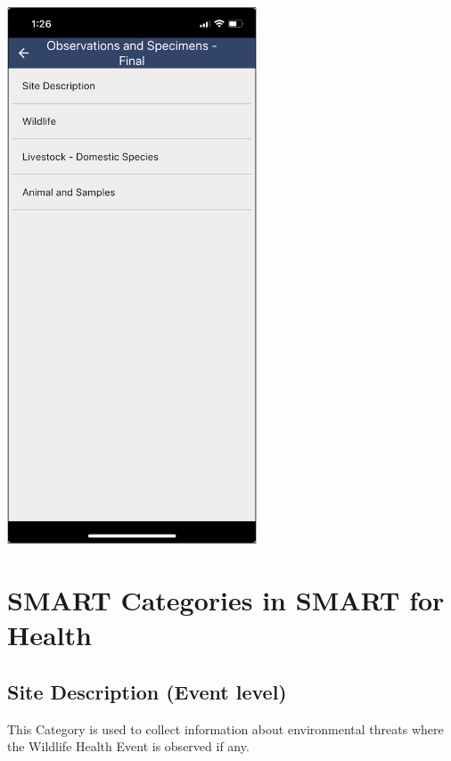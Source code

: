 \documentclass[
  letterpaper,
  DIV=11,
  numbers=noendperiod]{scrreprt}
\begin{document}
\includegraphics[width=2.91667in,height=\textheight]{Pictures_for_manual/Picture4.png}

\hypertarget{smart-categories-in-smart-for-health}{%
\section*{SMART Categories in SMART for
Health}\label{smart-categories-in-smart-for-health}}


\hypertarget{site-description-event-level}{%
\subsection*{Site Description (Event
level)}\label{site-description-event-level}}

This Category is used to collect information about environmental threats
where the Wildlife Health Event is observed if any.
\end{document}
